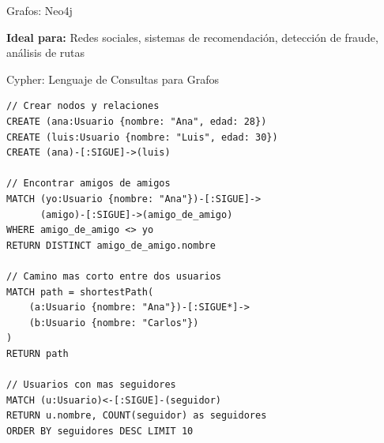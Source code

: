 \documentclass[aspectratio=169]{beamer}
\begin{document}
\begin{frame}{Grafos: Neo4j}
    \centering
    
    \vspace{0.3cm}
    \textbf{Ideal para:} Redes sociales, sistemas de recomendación, detección de fraude, análisis de rutas
\end{frame}

\begin{frame}[fragile]{Cypher: Lenguaje de Consultas para Grafos}
\begin{lstlisting}[style=jsonstyle]
// Crear nodos y relaciones
CREATE (ana:Usuario {nombre: "Ana", edad: 28})
CREATE (luis:Usuario {nombre: "Luis", edad: 30})
CREATE (ana)-[:SIGUE]->(luis)

// Encontrar amigos de amigos
MATCH (yo:Usuario {nombre: "Ana"})-[:SIGUE]->
      (amigo)-[:SIGUE]->(amigo_de_amigo)
WHERE amigo_de_amigo <> yo
RETURN DISTINCT amigo_de_amigo.nombre

// Camino mas corto entre dos usuarios
MATCH path = shortestPath(
    (a:Usuario {nombre: "Ana"})-[:SIGUE*]->
    (b:Usuario {nombre: "Carlos"})
)
RETURN path

// Usuarios con mas seguidores
MATCH (u:Usuario)<-[:SIGUE]-(seguidor)
RETURN u.nombre, COUNT(seguidor) as seguidores
ORDER BY seguidores DESC LIMIT 10
\end{lstlisting}
\end{frame}
\end{document}
